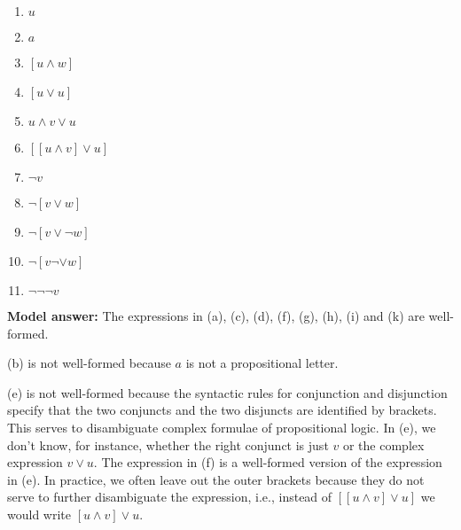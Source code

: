 \documentclass[a4,11pt]{article}
\newcommand{\6}{\mbox{$[\hspace*{-.6mm}[$}}
\newcommand{\9}{\mbox{$]\hspace*{-.6mm}]$}}
\begin{document}
\begin{enumerate}[leftmargin = 12pt]
\begin{enumerate}[noitemsep]
\item $u$ \hspace*{2cm}%
\item $a$ \hspace*{2cm} %
\item $[u \wedge w]$ \hspace*{2cm} %
\item $[u \vee u]$ \hspace*{2cm} %
\item $u \wedge v \vee u$ \hspace*{2cm} %
\item $[[u \wedge v] \vee u]$ \hspace*{2cm} %
\item $\neg v$ \hspace*{2cm} %
\item $\neg [v \vee w]$ \hspace*{2cm} %
\item $\neg [v \vee \neg w]$ \hspace*{2cm} %
\item $\neg [v \neg \vee w]$ \hspace*{2cm} %
\item $\neg \neg \neg v$ \hspace*{2cm}%
\end{enumerate}

{\bf Model answer:} The expressions in (a), (c), (d), (f), (g), (h), (i) and (k) are well-formed.

(b) is not well-formed because $a$ is not a propositional letter. 

(e) is not well-formed because the syntactic rules for conjunction and disjunction specify that the two conjuncts and the two disjuncts are identified by brackets. This serves to disambiguate complex formulae of propositional logic. In (e), we don't know, for instance, whether the right conjunct is just $v$ or the complex expression $v \vee u$. The expression in (f) is a well-formed version of the expression in (e). In practice, we often leave out the outer brackets because they do not serve to further disambiguate the expression, i.e., instead of $[[u \wedge v] \vee u]$ we would write $[u \wedge v] \vee u$.


\end{enumerate}
\end{document}
